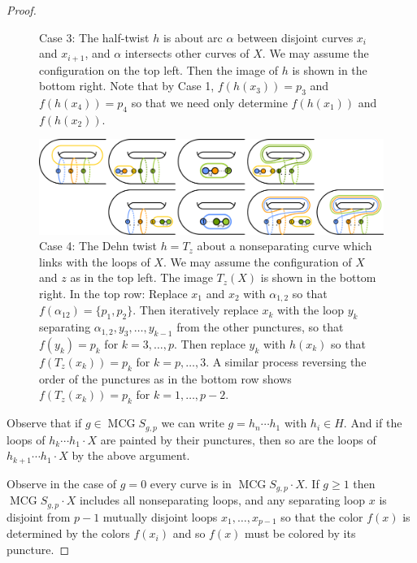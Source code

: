 \documentclass[11pt]{article}
\DeclareMathOperator{\mcg}{MCG}
\theoremstyle{remark}
\theoremstyle{definition}
\begin{document}
\begin{proof}
\begin{figure}[h!]
      \caption{Case 3: The half-twist $h$ is about arc $\alpha$
      between disjoint curves $x_i$ and $x_{i+1}$,
      and $\alpha$ intersects other curves of $X$.
      We may assume the configuration on the top left.
      Then the image of $h$ is shown in the bottom right.
      Note that by Case 1, $f(h(x_3))=p_3$ and $f(h(x_4))=p_4$
      so that we need only determine $f(h(x_1))$ and $f(h(x_2))$.
      }
      \label{fig:pcolor3}
    \end{figure}
    \begin{figure}[h!]
      \includegraphics[width=1\textwidth]{figures/pcolorsequence4.pdf}
      \caption{Case 4: The Dehn twist $h=T_z$ about a nonseparating curve
      which links with the loops of $X$.
      We may assume the configuration of $X$ and $z$ as in the top left.
      The image $T_z(X)$ is shown in the bottom right.
      In the top row: Replace $x_1$ and $x_2$ with $\alpha_{1,2}$
      so that $f(\alpha_{12})=\{p_1,p_2\}$.
      Then iteratively replace $x_k$ with the loop $y_k$ separating
      $\alpha_{1,2},y_3, \ldots, y_{k-1}$ from the other punctures,
      so that $f(y_k)=p_k$ for $k=3,\ldots,p$.
      Then replace $y_k$ with $h(x_k)$ so that $f(T_z(x_k))=p_k$
      for $k=p, \ldots, 3$.
      A similar process reversing the order of the punctures
      as in the bottom row shows $f(T_z(x_k))=p_k$ for $k=1,\ldots,p-2$.
      }
      \label{fig:pcolor4}
    \end{figure}

  Observe that if $g \in \mcg S_{g,p}$
  we can write $g= h_n \cdots h_1$ with $h_i \in H$.
  And if the loops of $h_k \cdots h_1 \cdot X$ are painted by their punctures,
  then so are the loops of $h_{k+1} \cdots h_1 \cdot X$ by the above argument.

  Observe in the case of $g=0$ every curve is in $\mcg S_{g,p} \cdot X$.
  If $g \geq 1$ then $\mcg S_{g,p} \cdot X$ includes all nonseparating loops,
  and any separating loop $x$ is disjoint from $p-1$ mutually disjoint loops $x_1,\ldots, x_{p-1}$
  so that
  the color $f(x)$ is determined by
  the colors
  $f(x_i)$
  and so $f(x)$ must be colored by its puncture.
\end{proof}
\end{document}
